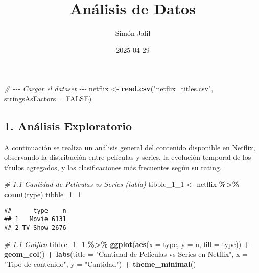 \documentclass[
]{article}
\title{Análisis de Datos}
\author{Simón Jalil}
\date{2025-04-29}
\newenvironment{Shaded}{\begin{snugshade}}{\end{snugshade}}
\newcommand{\AttributeTok}[1]{\textcolor[rgb]{0.13,0.29,0.53}{#1}}
\newcommand{\CommentTok}[1]{\textcolor[rgb]{0.56,0.35,0.01}{\textit{#1}}}
\newcommand{\ConstantTok}[1]{\textcolor[rgb]{0.56,0.35,0.01}{#1}}
\newcommand{\FunctionTok}[1]{\textcolor[rgb]{0.13,0.29,0.53}{\textbf{#1}}}
\newcommand{\NormalTok}[1]{#1}
\newcommand{\OtherTok}[1]{\textcolor[rgb]{0.56,0.35,0.01}{#1}}
\newcommand{\SpecialCharTok}[1]{\textcolor[rgb]{0.81,0.36,0.00}{\textbf{#1}}}
\newcommand{\StringTok}[1]{\textcolor[rgb]{0.31,0.60,0.02}{#1}}
\begin{document}
\maketitle

\begin{Shaded}
\begin{Highlighting}[]
\CommentTok{\# {-}{-}{-} Cargar el dataset {-}{-}{-}}
\NormalTok{netflix }\OtherTok{\textless{}{-}} \FunctionTok{read.csv}\NormalTok{(}\StringTok{"netflix\_titles.csv"}\NormalTok{, }\AttributeTok{stringsAsFactors =} \ConstantTok{FALSE}\NormalTok{)}
\end{Highlighting}
\end{Shaded}

\subsection{1. Análisis Exploratorio}\label{anuxe1lisis-exploratorio}

A continuación se realiza un análisis general del contenido disponible
en Netflix, observando la distribución entre películas y series, la
evolución temporal de los títulos agregados, y las clasificaciones más
frecuentes según su rating.

\begin{Shaded}
\begin{Highlighting}[]
\CommentTok{\# 1.1 Cantidad de Películas vs Series (tabla)}
\NormalTok{tibble\_1\_1 }\OtherTok{\textless{}{-}}\NormalTok{ netflix }\SpecialCharTok{\%\textgreater{}\%}
  \FunctionTok{count}\NormalTok{(type)}
\NormalTok{tibble\_1\_1}
\end{Highlighting}
\end{Shaded}

\begin{verbatim}
##      type    n
## 1   Movie 6131
## 2 TV Show 2676
\end{verbatim}

\begin{Shaded}
\begin{Highlighting}[]
\CommentTok{\# 1.1 Gráfico}
\NormalTok{tibble\_1\_1 }\SpecialCharTok{\%\textgreater{}\%}
  \FunctionTok{ggplot}\NormalTok{(}\FunctionTok{aes}\NormalTok{(}\AttributeTok{x =}\NormalTok{ type, }\AttributeTok{y =}\NormalTok{ n, }\AttributeTok{fill =}\NormalTok{ type)) }\SpecialCharTok{+}
  \FunctionTok{geom\_col}\NormalTok{() }\SpecialCharTok{+}
  \FunctionTok{labs}\NormalTok{(}\AttributeTok{title =} \StringTok{"Cantidad de Películas vs Series en Netflix"}\NormalTok{,}
       \AttributeTok{x =} \StringTok{"Tipo de contenido"}\NormalTok{, }\AttributeTok{y =} \StringTok{"Cantidad"}\NormalTok{) }\SpecialCharTok{+}
  \FunctionTok{theme\_minimal}\NormalTok{()}
\end{Highlighting}
\end{Shaded}
\end{document}
